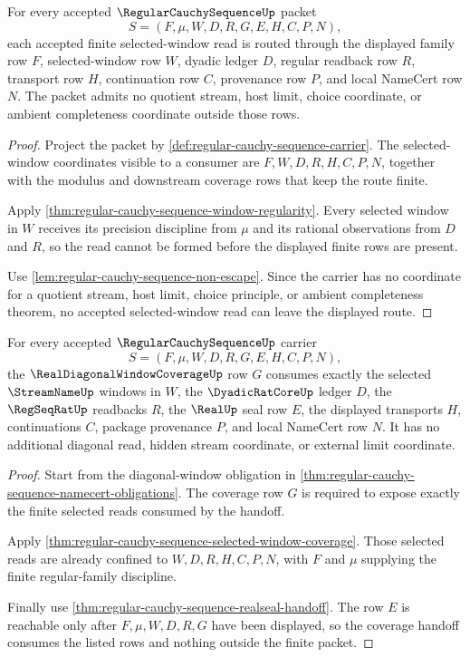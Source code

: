 \begin{theorem}
\label{thm:regular-cauchy-sequence-selected-window-coverage}
For every accepted $\RegularCauchySequenceUp$ packet
$$
S=(F,\mu,W,D,R,G,E,H,C,P,N),
$$
each accepted finite selected-window read is routed through the displayed family row $F$, selected-window row $W$, dyadic ledger $D$, regular readback row $R$, transport row $H$, continuation row $C$, provenance row $P$, and local NameCert row $N$. The packet admits no quotient stream, host limit, choice coordinate, or ambient completeness coordinate outside those rows.
\end{theorem}
\begin{proof}
Project the packet by \autoref{def:regular-cauchy-sequence-carrier}. The selected-window coordinates visible to a consumer are $F,W,D,R,H,C,P,N$, together with the modulus and downstream coverage rows that keep the route finite.

Apply \autoref{thm:regular-cauchy-sequence-window-regularity}. Every selected window in $W$ receives its precision discipline from $\mu$ and its rational observations from $D$ and $R$, so the read cannot be formed before the displayed finite rows are present.

Use \autoref{lem:regular-cauchy-sequence-non-escape}. Since the carrier has no coordinate for a quotient stream, host limit, choice principle, or ambient completeness theorem, no accepted selected-window read can leave the displayed route.
\end{proof}

\begin{theorem}
\label{thm:regular-cauchy-sequence-diagonal-window-coverage-handoff}
For every accepted $\RegularCauchySequenceUp$ carrier
$$
S=(F,\mu,W,D,R,G,E,H,C,P,N),
$$
the $\RealDiagonalWindowCoverageUp$ row $G$ consumes exactly the selected $\StreamNameUp$ windows in $W$, the $\DyadicRatCoreUp$ ledger $D$, the $\RegSeqRatUp$ readbacks $R$, the $\RealUp$ seal row $E$, the displayed transports $H$, continuations $C$, package provenance $P$, and local NameCert row $N$. It has no additional diagonal read, hidden stream coordinate, or external limit coordinate.
\end{theorem}
\begin{proof}
Start from the diagonal-window obligation in \autoref{thm:regular-cauchy-sequence-namecert-obligations}. The coverage row $G$ is required to expose exactly the finite selected reads consumed by the handoff.

Apply \autoref{thm:regular-cauchy-sequence-selected-window-coverage}. Those selected reads are already confined to $W,D,R,H,C,P,N$, with $F$ and $\mu$ supplying the finite regular-family discipline.

Finally use \autoref{thm:regular-cauchy-sequence-realseal-handoff}. The row $E$ is reachable only after $F,\mu,W,D,R,G$ have been displayed, so the coverage handoff consumes the listed rows and nothing outside the finite packet.
\end{proof}

